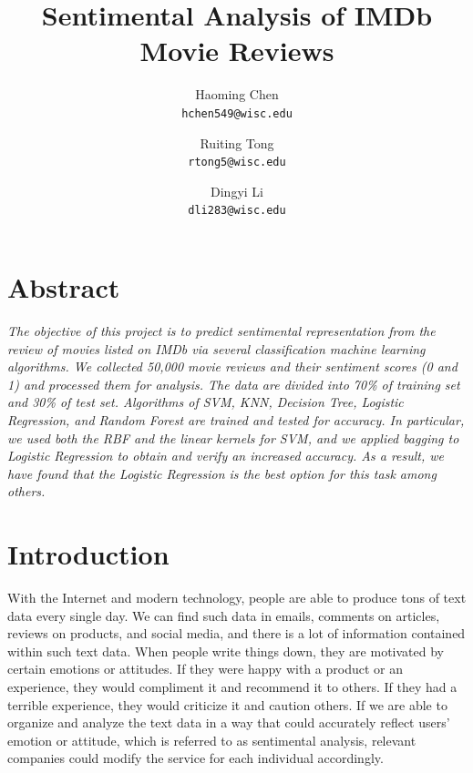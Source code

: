 \documentclass[10pt,twocolumn]{article}
\begin{document}
	\title{\textbf{Sentimental Analysis of IMDb Movie Reviews}}
	\author{Haoming Chen\\
		{\tt\small hchen549@wisc.edu}
		\and
		Ruiting Tong\\
		{\tt\small rtong5@wisc.edu}
		\and
		Dingyi Li\\
		{\tt\small dli283@wisc.edu}
	}
	\date{}
	\maketitle
	
	\section*{Abstract} 
	\textit{The objective of this project is to predict sentimental representation from the review of movies listed on IMDb via several classification machine learning algorithms. We collected 50,000 movie reviews and their sentiment scores (0 and 1) and processed them for analysis. The data are divided into 70\% of training set and 30\% of test set. Algorithms of SVM, KNN, Decision Tree, Logistic Regression, and Random Forest are trained and tested for accuracy. In particular, we used both the RBF and the linear kernels for SVM, and we applied bagging to Logistic Regression to obtain and verify an increased accuracy. As a result, we have found that the Logistic Regression is the best option for this task among others.} 			
	
	\section{Introduction} 
	With the Internet and modern technology, people are able to produce tons of text data every single day. We can find such data in emails, comments on articles, reviews on products, and social media, and there is a lot of information contained within such text data. When people write things down, they are motivated by certain emotions or attitudes. If they were happy with a product or an experience, they would compliment it and recommend it to others. If they had a terrible experience, they would criticize it and caution others. If we are able to organize and analyze the text data in a way that could accurately reflect users’ emotion or attitude, which is referred to as sentimental analysis, relevant companies could modify the service for each individual accordingly.
	
\end{document}
